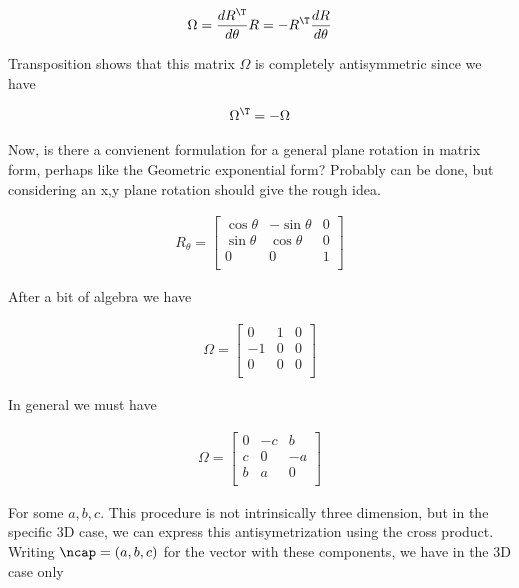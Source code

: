 \begin{align}\label{eqn:rotationGen:boo3}
\Omega = \frac{dR^\T}{d\theta} R = -R^\T \frac{dR}{d\theta}
\end{align}

Transposition shows that this matrix $\Omega$ is completely antisymmetric since we have

\begin{align}\label{eqn:rotationGen:boo4}
\Omega^\T = -\Omega
\end{align}

Now, is there a convienent formulation for a general plane rotation in matrix form, perhaps like the Geometric exponential form?  Probably can be done, but considering an x,y plane rotation should give the rough idea.

\begin{align}\label{eqn:rotationGen:boo5}
R_\theta = 
\begin{bmatrix}
\cos\theta & -\sin\theta & 0 \\
\sin\theta &  \cos\theta & 0 \\
0 & 0 & 1 \\
\end{bmatrix}
\end{align}

After a bit of algebra we have

\begin{align}\label{eqn:rotationGen:boo6}
\Omega = 
\begin{bmatrix}
0 & 1 & 0 \\
-1 & 0 & 0 \\
0 & 0 & 0 \\
\end{bmatrix}
\end{align}

In general we must have 

\begin{align}\label{eqn:rotationGen:boo7}
\Omega = 
\begin{bmatrix}
0 & -c & b \\
c & 0 & -a \\
b & a & 0 \\
\end{bmatrix}
\end{align}

For some $a,b,c$.  This procedure is not intrinsically three dimension, but in the specific 3D case, we can express this antisymetrization using the cross product.  Writing $\ncap = (a,b,c)$ for the vector with these components, we have in the 3D case only

